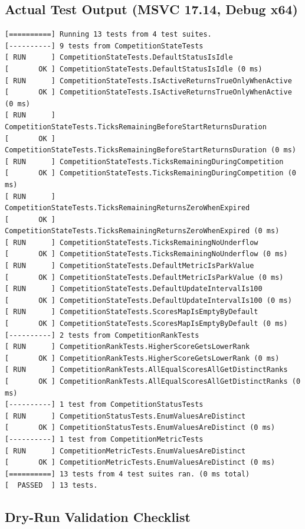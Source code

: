 \documentclass[12pt,a4paper]{article}
\begin{document}
\subsection{Actual Test Output (MSVC 17.14, Debug x64)}

\begin{lstlisting}[basicstyle=\ttfamily\footnotesize, caption={\texttt{tests.exe --gtest\_filter=Competition*} output}]
[==========] Running 13 tests from 4 test suites.
[----------] 9 tests from CompetitionStateTests
[ RUN      ] CompetitionStateTests.DefaultStatusIsIdle
[       OK ] CompetitionStateTests.DefaultStatusIsIdle (0 ms)
[ RUN      ] CompetitionStateTests.IsActiveReturnsTrueOnlyWhenActive
[       OK ] CompetitionStateTests.IsActiveReturnsTrueOnlyWhenActive (0 ms)
[ RUN      ] CompetitionStateTests.TicksRemainingBeforeStartReturnsDuration
[       OK ] CompetitionStateTests.TicksRemainingBeforeStartReturnsDuration (0 ms)
[ RUN      ] CompetitionStateTests.TicksRemainingDuringCompetition
[       OK ] CompetitionStateTests.TicksRemainingDuringCompetition (0 ms)
[ RUN      ] CompetitionStateTests.TicksRemainingReturnsZeroWhenExpired
[       OK ] CompetitionStateTests.TicksRemainingReturnsZeroWhenExpired (0 ms)
[ RUN      ] CompetitionStateTests.TicksRemainingNoUnderflow
[       OK ] CompetitionStateTests.TicksRemainingNoUnderflow (0 ms)
[ RUN      ] CompetitionStateTests.DefaultMetricIsParkValue
[       OK ] CompetitionStateTests.DefaultMetricIsParkValue (0 ms)
[ RUN      ] CompetitionStateTests.DefaultUpdateIntervalIs100
[       OK ] CompetitionStateTests.DefaultUpdateIntervalIs100 (0 ms)
[ RUN      ] CompetitionStateTests.ScoresMapIsEmptyByDefault
[       OK ] CompetitionStateTests.ScoresMapIsEmptyByDefault (0 ms)
[----------] 2 tests from CompetitionRankTests
[ RUN      ] CompetitionRankTests.HigherScoreGetsLowerRank
[       OK ] CompetitionRankTests.HigherScoreGetsLowerRank (0 ms)
[ RUN      ] CompetitionRankTests.AllEqualScoresAllGetDistinctRanks
[       OK ] CompetitionRankTests.AllEqualScoresAllGetDistinctRanks (0 ms)
[----------] 1 test from CompetitionStatusTests
[ RUN      ] CompetitionStatusTests.EnumValuesAreDistinct
[       OK ] CompetitionStatusTests.EnumValuesAreDistinct (0 ms)
[----------] 1 test from CompetitionMetricTests
[ RUN      ] CompetitionMetricTests.EnumValuesAreDistinct
[       OK ] CompetitionMetricTests.EnumValuesAreDistinct (0 ms)
[==========] 13 tests from 4 test suites ran. (0 ms total)
[  PASSED  ] 13 tests.
\end{lstlisting}

\subsection{Dry-Run Validation Checklist}
\end{document}
